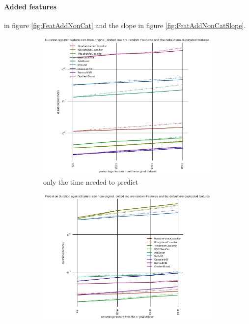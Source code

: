 \documentclass[a4paper,10pt]{article}
\begin{document}
\paragraph{Added features}
in figure \ref{fig:FeatAddNonCat} and the slope in figure \ref{fig:FeatAddNonCatSlope}.
\begin{figure}[H]
	\centering	
	\begin{subfigure}[b]{0.45\textwidth}
		\includegraphics[width=\textwidth]{images/scalability/FeatAddDupRandClass.png}
		\caption{only the time needed to predict }
		\label{fig:SADRC}
	\end{subfigure}
	\begin{subfigure}[b]{0.45\textwidth}
		\includegraphics[width=\textwidth]{images/scalability/FeatAddDupRandPred.png}

\end{subfigure}
\end{figure}
\end{document}
